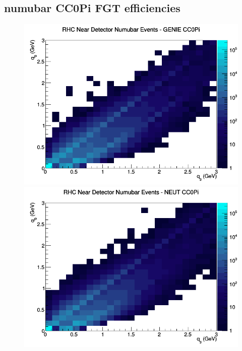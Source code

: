 \documentclass[12pt]{article}
\begin{document}
\subsection{numubar CC0Pi FGT efficiencies}
\begin{figure}[h]
\includegraphics[width=\linewidth]{eff_q0_q3/FGT/CC0Pi_RHC_ND_numubar_q3_q0_GENIE.png}
\endminipage
{}
\includegraphics[width=\linewidth]{eff_q0_q3/FGT/CC0Pi_RHC_ND_numubar_q3_q0_NEUT.png}
\endminipage
{}

\end{figure}
\end{document}
